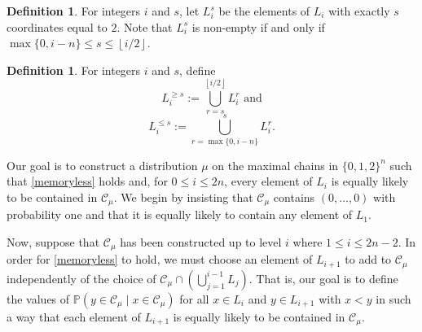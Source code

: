 \documentclass[11 pt]{article}
\theoremstyle{definition}
\newtheorem{defn}[equation]{Definition}
\theoremstyle{case}
\numberwithin{equation}{section}
\begin{document}
\begin{defn}
For integers $i$ and $s$, let $L_{i}^s$ be the elements of $L_i$ with exactly $s$ coordinates equal to $2$. Note that $L_i^s$ is non-empty if and only if $\max\{0,i-n\}\leq s\leq \left\lfloor i/2\right\rfloor$. 
\end{defn} 

\begin{defn}
For integers $i$ and $s$, define 
\[L_{i}^{\geq s}:=\bigcup_{r=s}^{\left\lfloor i/2\right\rfloor} L_i^r\text{ and}\]
\[L_{i}^{\leq s}:=\bigcup_{r=\max\{0,i-n\}}^{s} L_i^r.\]
\end{defn}

Our goal is to construct a distribution $\mu$ on the maximal chains in $\{0,1,2\}^n$ such that \eqref{memoryless} holds and, for $0\leq i\leq 2n$, every element of $L_i$ is equally likely to be contained in $\mathcal{C}_\mu$. We begin by insisting that $\mathcal{C}_\mu$ contains $(0,\dots,0)$ with probability one and that it is equally likely to contain any element of $L_1$. 

Now, suppose that $\mathcal{C}_\mu$ has been constructed up to level $i$ where $1\leq i\leq 2n-2$. In order for \eqref{memoryless} to hold, we must choose an element of $L_{i+1}$ to add to $\mathcal{C}_\mu$ independently of the choice of $\mathcal{C}_\mu\cap\left(\bigcup_{j=1}^{i-1}L_j\right)$. That is, our goal is to define the values of $\mathbb{P}(y\in \mathcal{C}_\mu\mid x\in\mathcal{C}_\mu)$ for all $x\in L_i$ and $y\in L_{i+1}$ with $x<y$ in such a way that each element of $L_{i+1}$ is equally likely to be contained in $\mathcal{C}_\mu$.
\end{document}
